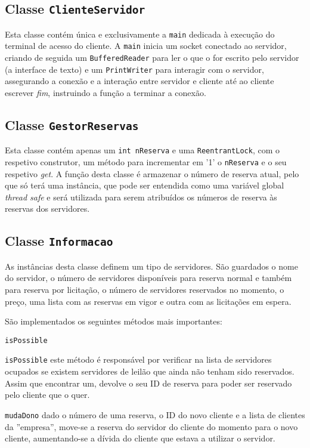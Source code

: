 \documentclass[11pt]{article}
\newcommand{\code}{\texttt}
\begin{document}
\subsection{Classe \code{ClienteServidor}}
Esta classe contém única e exclusivamente a \code{main} dedicada à execução do terminal de acesso do cliente. A \code{main} inicia um socket conectado ao servidor, criando de seguida um \code{BufferedReader} para ler o que o for escrito pelo servidor (a interface de texto) e um \code{PrintWriter} para interagir com o servidor, assegurando a conexão e a interação entre servidor e cliente até ao cliente escrever \emph{fim}, instruindo a função a terminar a conexão.

\subsection{Classe \code{GestorReservas}}
Esta classe contém apenas um \code{int nReserva} e uma \code{ReentrantLock}, com o respetivo construtor, um método para incrementar em '1' o \code{nReserva} e o seu respetivo \emph{get}. A função desta classe é armazenar o número de reserva atual, pelo que só terá uma instância, que pode ser entendida como uma variável global \emph{thread safe} e será utilizada para serem atribuídos os números de reserva às reservas dos servidores.

\subsection{Classe \code{Informacao}}
As instâncias desta classe definem um tipo de servidores. São guardados o nome do servidor, o número de servidores disponíveis para reserva normal e também para reserva por licitação, o número de servidores reservados no momento, o preço, uma lista com as reservas em vigor e outra com as licitações em espera.

São implementados os seguintes métodos mais importantes:

\begin{labeling}{\code{isPossible}}
    \item [\code{isPossible}] este método é responsável por verificar na lista de servidores ocupados se existem servidores de leilão que ainda não tenham sido reservados. Assim que  encontrar um, devolve o seu ID de reserva para poder ser reservado pelo cliente que o quer.
    \item [\code{mudaDono}] dado o número de uma reserva, o ID do novo cliente e a lista de clientes da ”empresa”, move-se a reserva do servidor do cliente do momento para o novo cliente,  aumentando-se a dívida do cliente que estava a utilizar o servidor.
    
\end{labeling}
\end{document}

